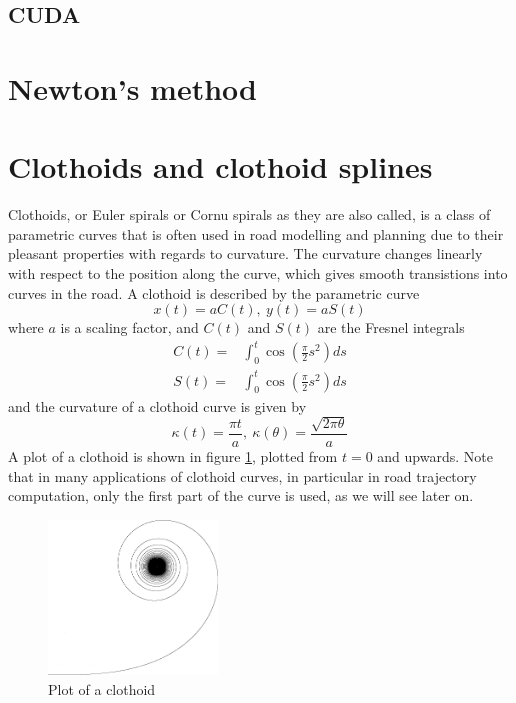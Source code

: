 \subsection{CUDA}

\section{Newton's method}


\section{Clothoids and clothoid splines}
\label{sec:back_clothoid}
Clothoids, or Euler spirals or Cornu spirals as they are also called, is a class of parametric curves that is often used in road modelling and planning due to their pleasant properties with regards to curvature. The curvature changes linearly with respect to the position along the curve, which gives smooth transistions into curves in the road. A clothoid is described by the parametric curve
\begin{equation}
x(t) = aC(t),\  y(t) = aS(t) 
\label{eq:clothoid}
\end{equation}
where $a$ is a scaling factor, and $C(t)$ and $S(t)$ are the Fresnel integrals
\begin{align}
C(t) =& \int_0^t \cos\left(\frac{\pi}{2}s^2\right) ds \label{eq:fresnel_c}\\
S(t) =& \int_0^t \cos\left(\frac{\pi}{2}s^2\right) ds \label{eq:fresnel_s}
\end{align}
and the curvature of a clothoid curve is given by 
\begin{equation}
\kappa(t) = \frac{\pi t}{a},\ \kappa(\theta) = \frac{\sqrt{2\pi\theta}}{a}
\label{eq:clothoid_curvature}
\end{equation}
A plot of a clothoid is shown in figure \ref{fig:back_clothoid}, plotted from $t=0$ and upwards. Note that in many applications of clothoid curves, in particular in road trajectory computation, only the first part of the curve is used, as we will see later on.

\begin{figure}[ht]
\centering
\includegraphics[width=0.4\textwidth]{figure/cornu}
\caption{Plot of a clothoid}
\label{fig:back_clothoid}
\end{figure}

